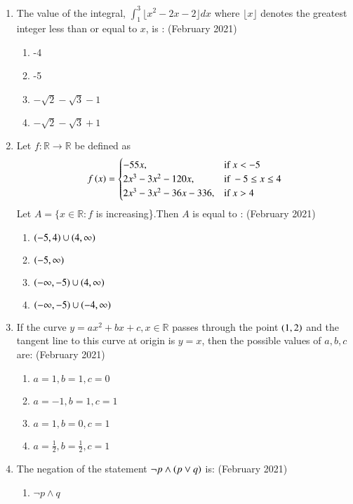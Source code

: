 \documentclass[journal,12pt,onecolumn]{IEEEtran}
\theoremstyle{remark}
\begin{document}
\begin{enumerate}
    \item The value of the integral, $\int_{1}^{3}\lfloor x^2 - 2x- 2\rfloor dx$ where $\lfloor x \rfloor$ denotes the greatest integer less than or equal to $x$, is :
   \hfill{(February 2021)} 
	\begin{enumerate}
        \item -4
        \item -5
        \item $-\sqrt{2}-\sqrt{3}-1$
        \item $-\sqrt{2}-\sqrt{3}+1$
    \end{enumerate}
    \item Let $f:\mathbb{R}\rightarrow\mathbb{R}$ be defined as 
    \[
    f\left(x\right)=
    \begin{cases}
        -55x,&\text{if } x<-5\\
        2x^3-3x^2-120x,&\text{if } -5\leq x\leq4\\
        2x^3-3x^2-36x-336,&\text{if } x>4
    \end{cases}
    \]
    Let $A=\{x \in \mathbb{R}:f$ is increasing\}.Then $A$ is equal to :
    \hfill{(February 2021)} 
    \begin{enumerate}
        \item $\left(-5,4\right) \cup \left(4,\infty\right)$
        \item $\left(-5,\infty\right)$
        \item $\left(-\infty,-5\right) \cup \left(4,\infty\right)$
        \item $\left(-\infty,-5\right) \cup \left(-4,\infty\right)$
    \end{enumerate}
    \item If the curve $y = ax^2 + bx + c,x \in \mathbb{R}$ passes through the point $\left(1, 2\right)$ and the tangent line to this curve at origin is $y = x$, then the possible values of $a, b, c$ are:
    \hfill{(February 2021)} 
    \begin{enumerate}
        \item $a = 1, b = 1, c = 0$
        \item $a = -1, b = 1, c = 1$
        \item $a = 1, b = 0, c = 1$
        \item $a = \frac{1}{2}, b = \frac{1}{2}, c = 1$
    \end{enumerate}
    \item  The negation of the statement $\neg p\land \left(p\lor q\right)$ is:
    \hfill{(February 2021)} 
    \begin{enumerate}
        \item $\neg p\land q$

\end{enumerate}
\end{enumerate}
\end{document}
